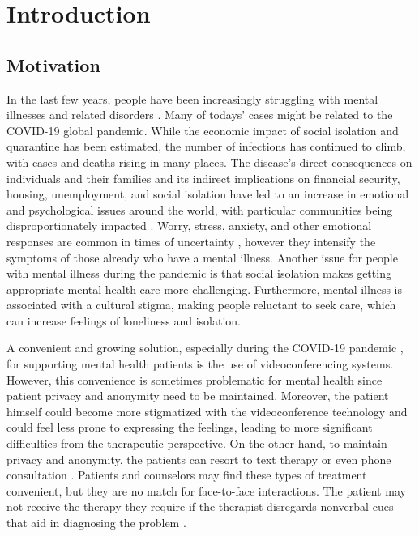 \section{Introduction}

\subsection{Motivation}
In the last few years, people have been increasingly struggling with mental illnesses and related disorders \cite{COS20, KUM21}. Many of todays' cases might be related to the COVID-19 global pandemic. While the economic impact of social isolation and quarantine has been estimated, the number of infections has continued to climb, with cases and deaths rising in many places. The disease's direct consequences on individuals and their families and its indirect implications on financial security, housing, unemployment, and social isolation have led to an increase in emotional and psychological issues around the world, with particular communities being disproportionately impacted \cite{CLA20, GAY20, RAS21}. Worry, stress, anxiety, and other emotional responses are common in times of uncertainty \cite{EHR20, CHE20, JOH20}, however they intensify the symptoms of those already who have a mental illness. Another issue for people with mental illness during the pandemic is that social isolation makes getting appropriate mental health care more challenging. Furthermore, mental illness is associated with a cultural stigma, making people reluctant to seek care, which can increase feelings of loneliness and isolation.

A convenient and growing solution, especially during the COVID-19 pandemic \cite{BOL20, BEK20, WIN20}, for supporting mental health patients is the use of videoconferencing systems. However, this convenience is sometimes problematic for mental health since patient privacy and anonymity need to be maintained. Moreover, the patient himself could become more stigmatized with the videoconference technology and could feel less prone to expressing the feelings, leading to more significant difficulties from the therapeutic perspective. On the other hand, to maintain privacy and anonymity, the patients can resort to text therapy or even phone consultation \cite{AGY21, LIB21, AGU21, AGY20, ZHA20}. Patients and counselors may find these types of treatment convenient, but they are no match for face-to-face interactions. The patient may not receive the therapy they require if the therapist disregards nonverbal cues that aid in diagnosing the problem \cite{SUC12, LIN21}.

